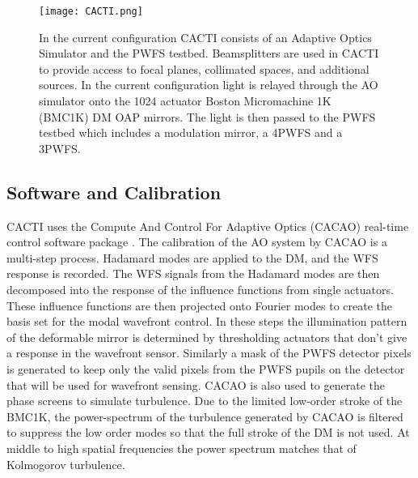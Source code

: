 \begin{figure}
    \centering
    \texttt{[image: CACTI.png]}
    \caption{In the current configuration CACTI consists of an Adaptive Optics Simulator and the PWFS testbed. Beamsplitters are used in CACTI to provide access to focal planes, collimated spaces, and additional sources. In the current configuration light is relayed through the AO simulator onto the 1024 actuator Boston Micromachine 1K (BMC1K) DM OAP mirrors. The light is then passed to the PWFS testbed which includes a modulation mirror, a 4PWFS and a 3PWFS.}
    \label{fig:CACTI}
\end{figure}

\subsection{Software and Calibration}

CACTI uses the Compute And Control For Adaptive Optics (CACAO) real-time control software package \cite{guyon2018compute}. The calibration of the AO system by CACAO is a multi-step process. Hadamard modes are applied to the DM, and the WFS response is recorded. The WFS signals from the Hadamard modes are then decomposed into the response of the influence functions from single actuators. These influence functions are then projected onto Fourier modes to create the basis set for the modal wavefront control. In these steps the illumination pattern of the deformable mirror is determined by thresholding actuators that don't give a response in the wavefront sensor. Similarly a mask of the PWFS detector pixels is generated to keep only the valid pixels from the PWFS pupils on the detector that will be used for wavefront sensing. CACAO is also used to generate the phase screens to simulate turbulence. Due to the limited low-order stroke of the BMC1K, the power-spectrum of the turbulence generated by CACAO is filtered to suppress the low order modes so that the full stroke of the DM is not used. At middle to high spatial frequencies the power spectrum matches that of Kolmogorov turbulence. 




